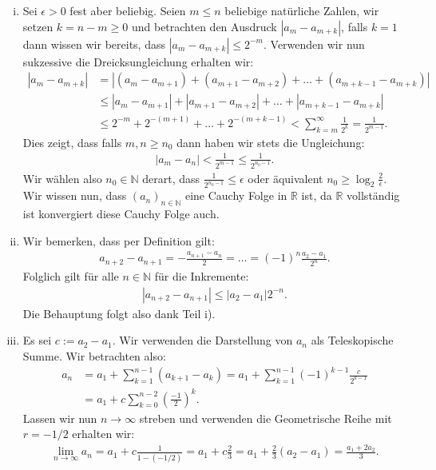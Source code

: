 \documentclass[a4paper, 20]{exam}
\begin{document}
\begin{solution}
\begin{enumerate}[i)]
\item Sei $ \epsilon >0$ fest aber beliebig. Seien $m \leq n$ beliebige natürliche Zahlen, wir setzen $k= n-m \geq 0$ und betrachten den Ausdruck $|a_m-a_{m+k}|$, falls $k=1$ dann wissen wir bereits, dass $|a_m-a_{m+k}| \leq 2^{-m}$. Verwenden wir nun sukzessive die Dreicksungleichung erhalten wir:
\begin{align*}
|a_m-a_{m+k}| &= |(a_m-a_{m+1}) + (a_{m+1}-a_{m+2}) + \dots + (a_{m+k-1}-a_{m+k})| \\
& \leq |a_m-a_{m+1}| + |a_{m+1}-a_{m+2}| + \dots + |a_{m+k-1}-a_{m+k}|\\
& \leq 2^{-m} + 2^{-(m+1)} + \dots + 2^{-(m+k-1)} < \sum_{k=m}^\infty \frac{1}{2^k} = \frac{1}{2^{m-1}}.
\end{align*}
Dies zeigt, dass falls $m,n \geq n_0$ dann haben wir stets die Ungleichung:
\begin{align*}
|a_m-a_n| < \frac{1}{2^{m-1}} \leq \frac{1}{2^{n_0-1}}.
\end{align*}
Wir wählen also $n_0 \in \mathbb{N}$ derart, dass $\frac{1}{2^{n_0-1}} \leq \epsilon$ oder äquivalent $n_0 \geq \log_2 \frac{2}{\epsilon}$. Wir wissen nun, dass $(a_n)_{n \in \mathbb{N}}$ eine Cauchy Folge in $\mathbb{R}$ ist, da $\mathbb{R}$ vollständig ist konvergiert diese Cauchy Folge auch. 

\item Wir bemerken, dass per Definition gilt:
\begin{align*}
a_{n+2}-a_{n+1} = - \frac{a_{n+1}-a_n}{2} = \dots = (-1)^n  \frac{a_2-a_1}{2^n}.
\end{align*}
Folglich gilt für alle $n \in \mathbb{N}$ für die Inkremente:
\begin{align*}
|a_{n+2}-a_{n+1}| \leq |a_2-a_1| 2^{-n}.
\end{align*}
Die Behauptung folgt also dank Teil i). 

\item Es sei $c:= a_2-a_1$. Wir verwenden die Darstellung von $a_n$ als Teleskopische Summe. Wir betrachten also:
\begin{align*}
a_n  &= a_1 + \sum_{k=1}^{n-1} (a_{k+1}-a_k) = a_1 + \sum_{k=1}^{n-1} (-1)^{k-1} \frac{c}{2^{k-1}} \\
& = a_1 + c\sum_{k=0}^{n-2} \left( \frac{-1}{2} \right)^k.
\end{align*}
Lassen wir nun $n \longrightarrow \infty$ streben und verwenden die Geometrische Reihe mit $r= -1/2$ erhalten wir:
\begin{align*}
\lim_{n \rightarrow \infty} a_n = a_1 + c \frac{1}{1-(-1/2)} = a_1 + c \frac{2}{3} = a_1 + \frac{2}{3}(a_2-a_1) = \frac{a_1+2a_2}{3}.
\end{align*}
\end{enumerate}

\end{solution}
\end{document}
